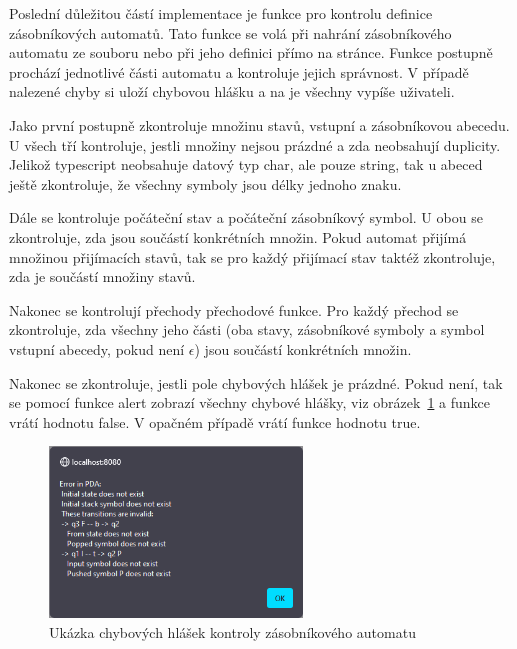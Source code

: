 Poslední důležitou částí implementace je funkce pro kontrolu definice zásobníkových automatů. Tato funkce se volá při nahrání zásobníkového automatu ze souboru nebo při jeho definici přímo na stránce. Funkce postupně prochází jednotlivé části automatu a kontroluje jejich správnost. V případě nalezené chyby si uloží chybovou hlášku a na je všechny vypíše uživateli.

Jako první postupně zkontroluje množinu stavů, vstupní a zásobníkovou abecedu. U všech tří kontroluje, jestli množiny nejsou prázdné a zda neobsahují duplicity. Jelikož typescript neobsahuje datový typ char, ale pouze string, tak u abeced ještě zkontroluje, že všechny symboly jsou délky jednoho znaku.

Dále se kontroluje počáteční stav a počáteční zásobníkový symbol. U obou se zkontroluje, zda jsou součástí konkrétních množin. Pokud automat přijímá množinou přijímacích stavů, tak se pro každý přijímací stav taktéž zkontroluje, zda je součástí množiny stavů. 

Nakonec se kontrolují přechody přechodové funkce. Pro každý přechod se zkontroluje, zda všechny jeho části (oba stavy, zásobníkové symboly a symbol vstupní abecedy, pokud není $\epsilon$) jsou součástí konkrétních množin.

Nakonec se zkontroluje, jestli pole chybových hlášek je prázdné. Pokud není, tak se pomocí funkce alert zobrazí všechny chybové hlášky, viz obrázek~\ref{fig:PDACheckErrors} a funkce vrátí hodnotu false. V opačném případě vrátí funkce hodnotu true.

\begin{figure}[h]
    \centering
    \includegraphics[width=0.6\textwidth]{Figures/PrntScrn_PDACheckErrors.png}
    \caption{Ukázka chybových hlášek kontroly zásobníkového automatu}\label{fig:PDACheckErrors}
\end{figure}

\endinput